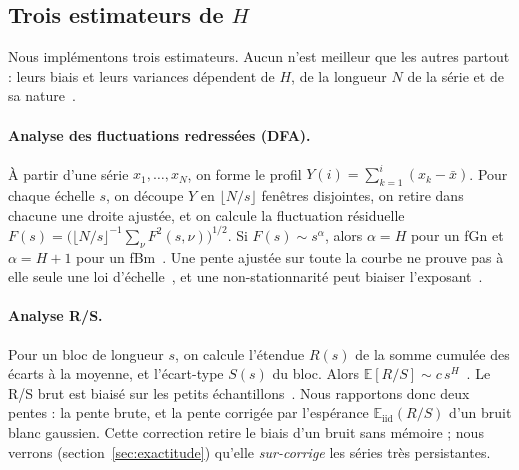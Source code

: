 \documentclass[11pt,a4paper]{article}
\newcommand{\E}{\mathbb{E}}
\renewcommand{\_}{\textunderscore\penalty0\hspace{0pt}}
\begin{document}
\subsection{Trois estimateurs de $H$}

Nous implémentons trois estimateurs. Aucun n'est meilleur que les autres partout : leurs
biais et leurs variances dépendent de $H$, de la longueur $N$ de la série et de sa
nature~\cite{katsev2003,weron2002}.

\paragraph{Analyse des fluctuations redressées (DFA).} À partir d'une série
$x_1,\dots,x_N$, on forme le profil $Y(i)=\sum_{k=1}^{i}(x_k-\bar x)$. Pour chaque échelle
$s$, on découpe $Y$ en $\lfloor N/s\rfloor$ fenêtres disjointes, on retire dans chacune une
droite ajustée, et on calcule la fluctuation résiduelle
$F(s)=\bigl(\lfloor N/s\rfloor^{-1}\sum_\nu F^2(s,\nu)\bigr)^{1/2}$. Si
$F(s)\sim s^{\alpha}$, alors $\alpha=H$ pour un fGn et $\alpha=H+1$ pour un
fBm~\cite{peng1994}. Une pente ajustée sur toute la courbe ne prouve pas à elle seule une
loi d'échelle~\cite{maraun2004}, et une non-stationnarité peut biaiser l'exposant~\cite{chen2002}.

\paragraph{Analyse R/S.} Pour un bloc de longueur $s$, on calcule l'étendue $R(s)$ de la
somme cumulée des écarts à la moyenne, et l'écart-type $S(s)$ du bloc. Alors
$\E[R/S]\sim c\,s^{H}$~\cite{hurst1951,mandelbrot1969}. Le R/S brut est biaisé sur les
petits échantillons~\cite{anis1976,lo1991}. Nous rapportons donc deux pentes : la pente
brute, et la pente corrigée par l'espérance $\E_{\mathrm{iid}}(R/S)$ d'un bruit blanc
gaussien. Cette correction retire le biais d'un bruit sans mémoire ; nous verrons
(section~\ref{sec:exactitude}) qu'elle \emph{sur-corrige} les séries très persistantes.
\end{document}
